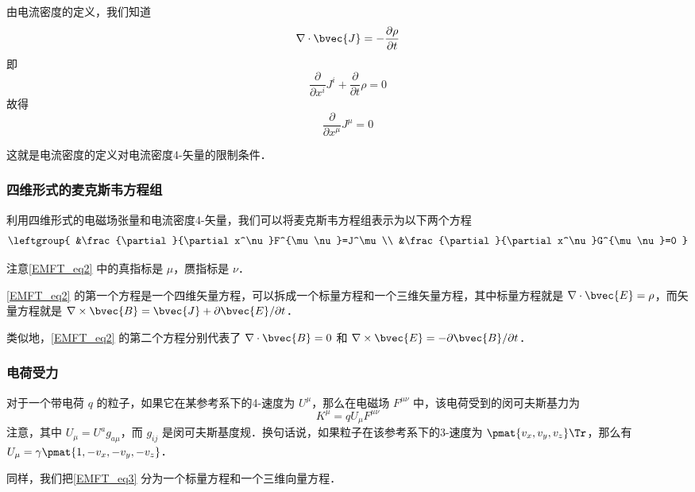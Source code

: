 由电流密度的定义，我们知道
\begin{equation}
\nabla\cdot\bvec{J}=-\frac{\partial\rho}{\partial t}
\end{equation}
即
\begin{equation}
\frac{\partial}{\partial x^i}J^i+\frac{\partial}{\partial t}\rho=0
\end{equation}
故得
\begin{equation}
\frac{\partial}{\partial x^\mu}J^\mu=0
\end{equation}

这就是电流密度的定义对电流密度4-矢量的限制条件．


\subsubsection{四维形式的麦克斯韦方程组}

利用四维形式的电磁场张量和电流密度4-矢量，我们可以将麦克斯韦方程组表示为以下两个方程
\begin{equation}\label{EMFT_eq2}
\leftgroup{
    &\frac{\partial}{\partial x^\nu}F^{\mu\nu}=J^\mu\\
    &\frac{\partial}{\partial x^\nu}G^{\mu\nu}=0
}
\end{equation}

注意\autoref{EMFT_eq2} 中的真指标是 $\mu$，赝指标是 $\nu$．

\autoref{EMFT_eq2} 的第一个方程是一个四维矢量方程，可以拆成一个标量方程和一个三维矢量方程，其中标量方程就是 $\nabla\cdot\bvec{E}=\rho$，而矢量方程就是 $\nabla\times\bvec{B}=\bvec{J}+\partial\bvec{E}/\partial t$． 

类似地，\autoref{EMFT_eq2} 的第二个方程分别代表了 $\nabla\cdot\bvec{B}=0$ 和 $\nabla\times\bvec{E}=-\partial\bvec{B}/\partial t$．

\subsubsection{电荷受力}

对于一个带电荷 $q$ 的粒子，如果它在某参考系下的4-速度为 $U^\mu$，那么在电磁场 $F^{\mu\nu}$ 中，该电荷受到的闵可夫斯基力为
\begin{equation}\label{EMFT_eq3}
K^{\mu}=qU_\mu F^{\mu\nu}
\end{equation}
注意，其中 $U_\mu=U^ag_{a\mu}$，而 $g_{ij}$ 是闵可夫斯基度规．换句话说，如果粒子在该参考系下的3-速度为 $\pmat{v_x, v_y, v_z}\Tr$，那么有 $U_\mu=\gamma\pmat{1, -v_x, -v_y, -v_z}$．

同样，我们把\autoref{EMFT_eq3} 分为一个标量方程和一个三维向量方程．

